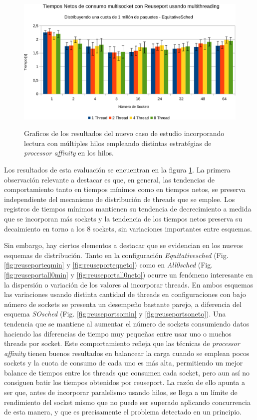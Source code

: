 \begin{figure}[h!]
{		\centering
		\includegraphics[width=.47\textwidth]{resultados/reuseport36-crop.pdf}
		\label{fig:reuseporteqneto}
	}
	\caption{Graficos de los resultados del nuevo caso de estudio incorporando lectura con múltiples hilos empleando distintas estratégias de \emph{processor affinity} en los hilos.}
	\label{fig:resultadosReuseport3}
\end{figure}

Los resultados de esta evaluación se encuentran en la figura \ref{fig:resultadosReuseport3}. La primera observación relevante a destacar es que, en general, las tendencias de comportamiento tanto en tiempos mínimos como en tiempos netos, se preserva independiente del mecanismo de distribución de threads que se emplee. Los registros de tiempos mínimos mantienen su tendencia de decrecimiento a medida que se incorporan más sockets y la tendencia de los tiempos netos preserva su decaimiento en torno a los 8 sockets, sin variaciones importantes entre esquemas.

Sin embargo, hay ciertos elementos a destacar que se evidencian en los nuevos esquemas de distribución. Tanto en la configuración \emph{Equitativesched} (Fig. \ref{fig:reuseporteqmin} y \ref{fig:reuseporteqneto}) como en \emph{All0sched} (Fig. \ref{fig:reuseportall0min} y \ref{fig:reuseportall0neto}) ocurre un fenómeno interesante en la dispersión o variación de los valores al incorporar threads. En ambos esquemas las variaciones usando distinta cantidad de threads en configuraciones con bajo número de sockets se presenta un desempeño bastante parejo, a diferencia del esquema \emph{SOsched} (Fig. \ref{fig:reuseportsomin} y \ref{fig:reuseportsoneto}). Una tendencia que se mantiene al aumentar el número de sockets consumiendo datos haciendo las diferencias de tiempo muy pequeñas entre usar uno o muchos threads por socket. Este comportamiento refleja que las técnicas de \emph{processor affinity} tienen buenos resultados en balancear la carga cuando se emplean pocos sockets y la cuota de consumo de cada uno es más alta, permitiendo un mejor balance de tiempos entre los threads que consumen cada socket, pero aun así no consiguen batir los tiempos obtenidos por reuseport. La razón de ello apunta a ser que, antes de incorporar paralelismo usando hilos, se llega a un límite de rendimiento del socket mismo que no puede ser superado aplicando concurrencia de esta manera, y que es precisamente el problema detectado en un principio.

